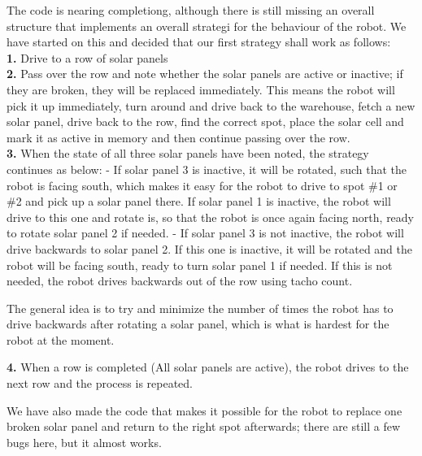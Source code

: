 The code is nearing completiong, although there is still missing an
overall structure that implements an overall strategi for the behaviour
of the robot. We have started on this and decided that our first
strategy shall work as follows:\\\textbf{1.} Drive to a row of solar
panels\\\textbf{2.} Pass over the row and note whether the solar panels
are active or inactive; if they are broken, they will be replaced
immediately. This means the robot will pick it up immediately, turn
around and drive back to the warehouse, fetch a new solar panel, drive
back to the row, find the correct spot, place the solar cell and mark it
as active in memory and then continue passing over the row.\\\textbf{3.}
When the state of all three solar panels have been noted, the strategy
continues as below: - If solar panel 3 is inactive, it will be rotated,
such that the robot is facing south, which makes it easy for the robot
to drive to spot \#1 or \#2 and pick up a solar panel there. If solar
panel 1 is inactive, the robot will drive to this one and rotate is, so
that the robot is once again facing north, ready to rotate solar panel 2
if needed. - If solar panel 3 is not inactive, the robot will drive
backwards to solar panel 2. If this one is inactive, it will be rotated
and the robot will be facing south, ready to turn solar panel 1 if
needed. If this is not needed, the robot drives backwards out of the row
using tacho count.

The general idea is to try and minimize the number of times the robot
has to drive backwards after rotating a solar panel, which is what is
hardest for the robot at the moment.

\textbf{4.} When a row is completed (All solar panels are active), the
robot drives to the next row and the process is repeated.

We have also made the code that makes it possible for the robot to
replace one broken solar panel and return to the right spot afterwards;
there are still a few bugs here, but it almost works.
